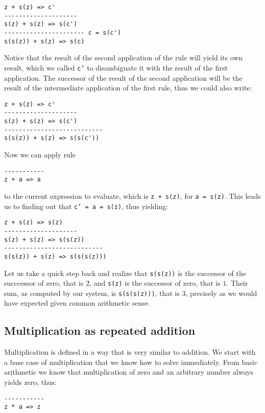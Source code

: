\begin{lstlisting}
z + s(z) => c'
--------------------
s(z) + s(z) => s(c')
---------------------- c = s(c')
s(s(z)) + s(z) => s(c)
\end{lstlisting}

Notice that the result of the second application of the rule will yield its own result, which we called \texttt{c'} to disambiguate it with the result of the first application. The successor of the result of the second application will be the result of the intermediate application of the first rule, thus we could also write:

\begin{lstlisting}
z + s(z) => c'
--------------------
s(z) + s(z) => s(c')
---------------------------
s(s(z)) + s(z) => s(s(c'))
\end{lstlisting}

Now we can apply rule 

\begin{lstlisting}
-----------
z + a => a
\end{lstlisting}

to the current expression to evaluate, which is \texttt{z + s(z)}, for \texttt{a = s(z)}. This leads us to finding out that \texttt{c' = a = s(z)}, thus yielding:

\begin{lstlisting}
z + s(z) => s(z)
--------------------
s(z) + s(z) => s(s(z))
---------------------------
s(s(z)) + s(z) => s(s(s(z)))
\end{lstlisting}

Let us take a quick step back and realize that \texttt{s(s(z))} is the successor of the succcessor of zero, that is $2$, and \texttt{s(z)} is the successor of zero, that is $1$. Their sum, as computed by our system, is \texttt{s(s(s(z)))}, that is $3$, precisely as we would have expected given common arithmetic sense.


\subsection{Multiplication as repeated addition}
Multiplication is defined in a way that is very similar to addition. We start with a base case of multiplication that we know how to solve immediately. From basic arithmetic we know that multiplication of zero and an arbitrary number always yields zero, thus:

\begin{lstlisting}
-----------
z * a => z
\end{lstlisting}

